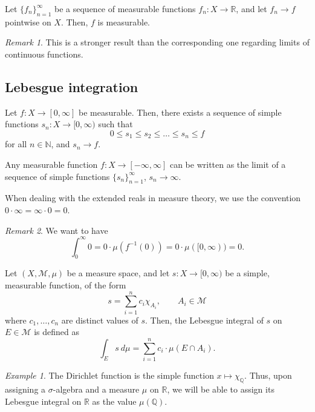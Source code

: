 \documentclass[11pt]{article}
\newcommand{\R}{\mathbb{R}}
\newcommand{\Q}{\mathbb{Q}}
\newcommand{\N}{\mathbb{N}}
\newcommand{\M}{\mathcal{M}}
\theoremstyle{definition}
\theoremstyle{remark}
\newtheorem*{remark}{Remark}
\newtheorem*{example}{Example}
\numberwithin{equation}{section}
\begin{document}
    \begin{theorem}
        Let $\{f_n\}_{n = 1}^\infty$ be a sequence of measurable functions $f_n\colon
        X \to \R$, and let $f_n \to f$ pointwise on $X$. Then, $f$ is measurable.
        \begin{remark}
            This is a stronger result than the corresponding one regarding limits of
            continuous functions.
        \end{remark}
    \end{theorem}

    

    \subsection{Lebesgue integration}

    \begin{theorem}
        Let $f\colon X \to [0, \infty]$ be measurable. Then, there exists a sequence
        of simple functions $s_n\colon X \to [0, \infty)$ such that \[
            0 \leq s_1 \leq s_2 \leq \dots \leq s_n \leq f
        \] for all $n \in \N$, and $s_n \to f$.
    \end{theorem}
    \begin{corollary}
        Any measurable function $f\colon X \to [-\infty, \infty]$ can be written as
        the limit of a sequence of simple functions $\{s_n\}_{n = 1}^\infty$, $s_n
        \to \infty$.
    \end{corollary}

    \begin{definition}
        When dealing with the extended reals in measure theory, we use the convention
        $0\cdot \infty = \infty \cdot 0 = 0$.
        \begin{remark}
            We want to have \[
                \int_0^\infty 0 = 0\cdot \mu(f^{-1}(0)) = 0\cdot \mu([0, \infty)) =
                0.
            \] 
        \end{remark}
    \end{definition}

    
    \begin{definition}
        Let $(X, \M, \mu)$ be a measure space, and let $s\colon X \to [0, \infty)$ be
        a simple, measurable function, of the form \[
            s = \sum_{i = 1}^n c_i\chi_{A_i}, \qquad A_i \in \M
        \] where $c_1, \dots, c_n$ are distinct values of $s$. Then, the Lebesgue
        integral of $s$ on $E \in \M$ is defined as \[
            \int_E s\:d\mu = \sum_{i = 1}^n c_i\cdot \mu(E \cap A_i).
        \] 
    \end{definition}
    \begin{example}
        The Dirichlet function is the simple function $x\mapsto \chi_\Q$. Thus, upon
        assigning a $\sigma$-algebra and a measure $\mu$ on $\R$, we will be able to
        assign its Lebesgue integral on $\R$ as the value $\mu(\Q)$.
    \end{example}
    
\end{document}
